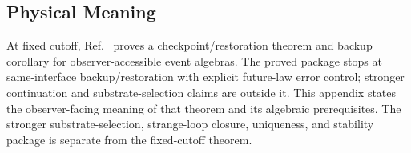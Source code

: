 \subsection{Physical Meaning}

At fixed cutoff, Ref.~\cite{ophmicrophysics} proves a checkpoint/restoration theorem and backup
corollary for observer-accessible event algebras. The proved package stops at same-interface
backup/restoration with explicit future-law error control; stronger continuation and
substrate-selection claims are outside it. This appendix states the observer-facing meaning
of that theorem and its algebraic prerequisites. The stronger substrate-selection, strange-loop
closure, uniqueness, and stability package is separate from the fixed-cutoff theorem.


